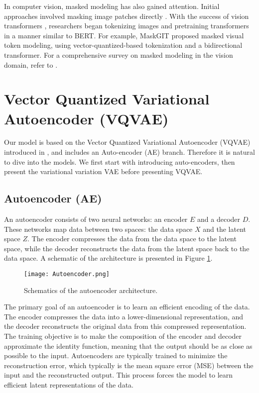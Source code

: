 \documentclass[../../thesis.tex]{subfiles}
\begin{document}
In computer vision, masked modeling has also gained attention. Initial approaches involved masking image patches directly \cite{he2021masked}. With the success of vision transformers \cite{dosovitskiy2021image}, researchers began tokenizing images and pretraining transformers in a manner similar to BERT. For example, MaskGIT \cite{chang2022maskgit} proposed masked visual token modeling, using vector-quantized-based tokenization and a bidirectional transformer. For a comprehensive survey on masked modeling in the vision domain, refer to \cite{li2024masked}.

\section{Vector Quantized Variational Autoencoder (VQVAE)}
\label{section:VQVAE}
Our model is based on the Vector Quantized Variational Autoencoder (VQVAE) introduced in \cite{VQVAE}, and includes an Auto-encoder (AE) branch. Therefore it is natural to dive into the models. We first start with introducing auto-encoders, then present the variational variation VAE before presenting VQVAE. 

\subsection{Autoencoder (AE)}

An autoencoder consists of two neural networks: an encoder $E$ and a decoder $D$. These networks map data between two spaces: the data space $X$ and the latent space $Z$. The encoder compresses the data from the data space to the latent space, while the decoder reconstructs the data from the latent space back to the data space. A schematic of the architecture is presented in Figure \ref{fig:autoencoder}.

\begin{figure}[h]
    \texttt{[image: Autoencoder.png]}
    \centering
    \caption{Schematics of the autoencoder architecture.}
    \label{fig:autoencoder}
\end{figure}

The primary goal of an autoencoder is to learn an efficient encoding of the data. The encoder compresses the data into a lower-dimensional representation, and the decoder reconstructs the original data from this compressed representation. The training objective is to make the composition of the encoder and decoder approximate the identity function, meaning that the output should be as close as possible to the input. Autoencoders are typically trained to minimize the reconstruction error, which typically is the mean square error (MSE) between the input and the reconstructed output. This process forces the model to learn efficient latent representations of the data.\newline
\end{document}
